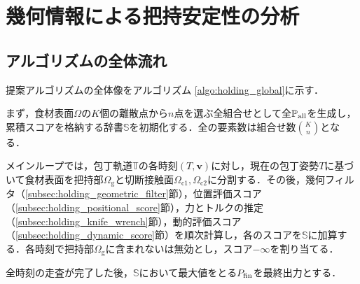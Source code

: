 \section{幾何情報による把持安定性の分析}
\label{sec:holding_analysis}

\subsection{アルゴリズムの全体流れ}
\label{subsec:holding_algorithm_flow}

提案アルゴリズムの全体像をアルゴリズム \ref{algo:holding_global}に示す．

まず，食材表面$\Omega$の$K$個の離散点から$n$点を選ぶ全組合せとして全{\nameholdingpointset}$\mathbb{P}_{\mathrm{all}}$を生成し，累積スコアを格納する辞書$\mathbb{S}$を初期化する．全{\nameholdingpointset}の要素数は組合せ数$\binom{K}{n}$となる．

メインループでは，包丁軌道$\mathbb{T}$の各時刻$(T,\bm{v})$に対し，現在の包丁姿勢$T$に基づいて食材表面を把持部$\Omega_{\mathrm{g}}$と切断接触面$\Omega_{\mathrm{c1}},\Omega_{\mathrm{c2}}$に分割する．その後，幾何フィルタ（\ref{subsec:holding_geometric_filter}節），位置評価スコア（\ref{subsec:holding_positional_score}節），力とトルクの推定（\ref{subsec:holding_knife_wrench}節），動的評価スコア（\ref{subsec:holding_dynamic_score}節）を順次計算し，各{\nameholdingpointset}のスコアを$\mathbb{S}$に加算する．各時刻で把持部$\Omega_{\mathrm{g}}$に含まれない{\nameholdingpointset}は無効とし，スコア$-\infty$を割り当てる．

全時刻の走査が完了した後，$\mathbb{S}$において最大値をとる{\nameholdingpointset}$\equholdingpointset[fin]$を最終出力とする．



